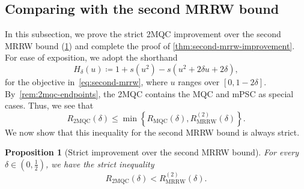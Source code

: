 \documentclass[11pt]{article}
\renewcommand{\leq}{\leqslant}
\newtheorem{prop}[prop]{Proposition}
\theoremstyle{remark}
\newcommand{\MRRW}{R_{\mathrm{MRRW}}}
\newcommand{\MQC}{\mathrm{MQC}}
\newcommand{\mMQC}{2\mathrm{MQC}}
\begin{document}
\subsection{Comparing with the second MRRW bound}
\label{subsec:comparing-second-mrrw}

In this subsection, we prove the strict 2MQC improvement over the second MRRW bound (\cref{prop:2mqc-strict-mrrw2}) and complete the proof of \cref{thm:second-mrrw-improvement}. For ease of exposition, we adopt the shorthand
\begin{equation}
\label{eq:second-mrrw-holevo-function}
H_\delta(u) \coloneqq 1+s(u^2)-s(u^2+2\delta u+2\delta),
\end{equation}
for the objective in~\eqref{eq:second-mrrw}, where $u$ ranges over $[0,1-2\delta]$. By~\cref{rem:2mqc-endpoints}, the 2MQC contains the MQC and mPSC as special cases. Thus, we see that
\begin{equation*}
R_{\mMQC}(\delta) \leq \min\left\{R_{\MQC}(\delta),\MRRW^{(2)}(\delta)\right\}.
\end{equation*}
We now show that this inequality for the second MRRW bound is always strict.

\begin{prop}[Strict improvement over the second MRRW bound]
\label{prop:2mqc-strict-mrrw2}
For every $\delta \in (0,\frac{1}{2})$, we have the strict inequality
\begin{equation*}
R_{\mMQC}(\delta) < \MRRW^{(2)}(\delta).
\end{equation*}
\end{prop}
\end{document}
